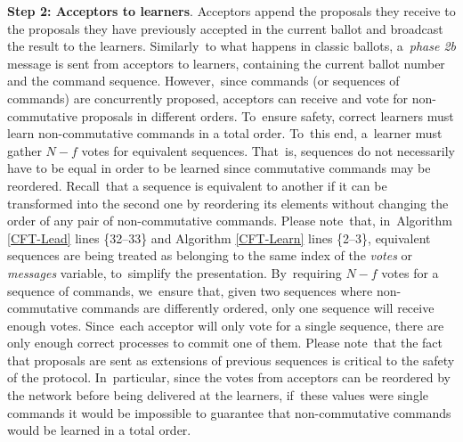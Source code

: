 \documentclass[algorithms,article,accept,moreauthors,pdftex,10pt,a4paper]{Definitions/mdpi}
\begin{document}
{\bf Step 2: Acceptors to learners}.
Acceptors append the proposals they receive to the proposals they have previously accepted in the current ballot and broadcast the result to the learners. Similarly~to what happens in classic ballots, a~\textit{phase 2b} message is sent from acceptors to learners, containing the current ballot number and the command sequence. However,~since commands (or sequences of commands) are concurrently proposed, acceptors can receive and vote for non-commutative proposals in different orders. To~ensure safety, correct learners must learn non-commutative commands in a total order. To~this end, a~learner must gather $N-f$ votes for equivalent sequences. That~is, sequences do not necessarily have to be equal in order to be learned since commutative commands may be reordered. Recall~that a sequence is equivalent to another if it can be transformed into the second one by reordering its elements without changing the order of any pair of non-commutative commands. Please note~that, in~Algorithm \ref{CFT-Lead} lines \{32--33\} and Algorithm \ref{CFT-Learn} lines \{2--3\}, equivalent sequences are being treated as belonging to the same index of the \textit{votes} or \emph{messages} variable, to~simplify the presentation. By~requiring $N-f$ votes for a sequence of commands, we~ensure that, given two sequences where non-commutative commands are differently ordered, only one sequence will receive enough votes. Since~each acceptor will only vote for a single sequence, there are only enough correct processes to commit one of them. Please note~that the fact that proposals are sent as extensions of previous sequences is critical to the safety of the protocol. In~particular, since the votes from acceptors can be reordered by the network before being delivered at the learners, if~these values were single commands it would be impossible to guarantee that non-commutative commands would be learned in a total order. \par
\end{document}
